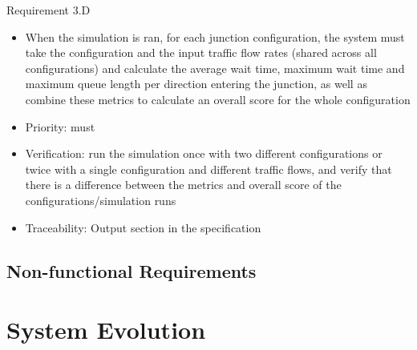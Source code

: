 \documentclass{article}
\begin{document}
Requirement 3.D
\begin{itemize}
  \item When the simulation is ran, for each junction configuration, the system must take the configuration and the input traffic flow rates (shared across all configurations) and calculate the average wait time, maximum wait time and maximum queue length per direction entering the junction, as well as combine these metrics to calculate an overall score for the whole configuration
  \item Priority: must
  \item Verification: run the simulation once with two different configurations or twice with a single configuration and different traffic flows, and verify that there is a difference between the metrics and overall score of the configurations/simulation runs
  \item Traceability: Output section in the specification
\end{itemize}
\subsection{Non-functional Requirements}

\section{System Evolution}
\end{document}
